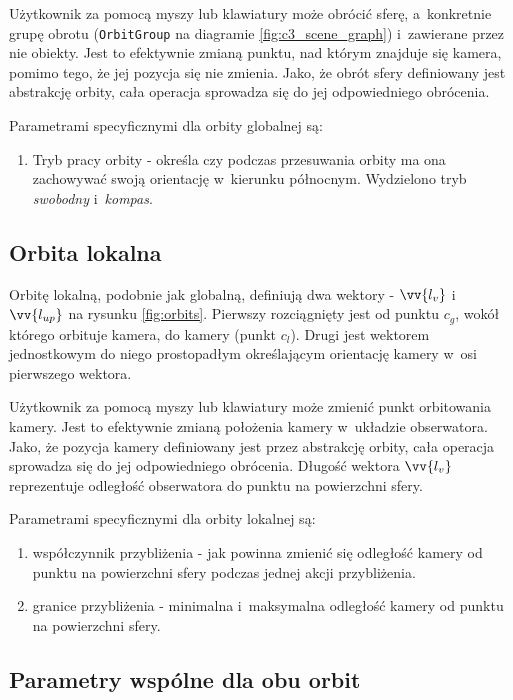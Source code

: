 Użytkownik za pomocą myszy lub klawiatury może obrócić sferę, a~konkretnie grupę obrotu (\texttt{OrbitGroup} na diagramie \ref{fig:c3_scene_graph}) i~zawierane przez nie obiekty. Jest to efektywnie zmianą punktu, nad którym znajduje się kamera, pomimo tego, że jej pozycja się nie zmienia. Jako, że obrót sfery definiowany jest abstrakcję orbity, cała operacja sprowadza się do jej odpowiedniego obrócenia. 
\begin{samepage}
Parametrami specyficznymi dla orbity globalnej są:
\begin{enumerate}
    \item Tryb pracy orbity - określa czy podczas przesuwania orbity ma ona zachowywać swoją orientację w~kierunku północnym. Wydzielono tryb \textit{swobodny} i~\textit{kompas}.
\end{enumerate}
\end{samepage}
\subsection{Orbita lokalna}

Orbitę lokalną, podobnie jak globalną, definiują dwa wektory - $\vv{l_v}$ i~$\vv{l_{up}}$ na rysunku \ref{fig:orbits}. Pierwszy rozciągnięty jest od punktu $c_g$, wokół którego orbituje kamera, do kamery (punkt $c_l$). Drugi jest wektorem jednostkowym do niego prostopadłym określającym orientację kamery w~osi pierwszego wektora.

Użytkownik za pomocą myszy lub klawiatury może zmienić punkt orbitowania kamery. Jest to efektywnie zmianą położenia kamery w~układzie obserwatora. Jako, że pozycja kamery definiowany jest przez abstrakcję orbity, cała operacja sprowadza się do jej odpowiedniego obrócenia. Długość wektora $\vv{l_v}$ reprezentuje odległość obserwatora do punktu na powierzchni sfery. 

Parametrami specyficznymi dla orbity lokalnej są:
\begin{enumerate}
    \item współczynnik przybliżenia - jak powinna zmienić się odległość kamery od punktu na powierzchni sfery podczas jednej akcji przybliżenia.
    \item granice przybliżenia - minimalna i~maksymalna odległość kamery od punktu na powierzchni sfery.
\end{enumerate}

\subsection{Parametry wspólne dla obu orbit}

